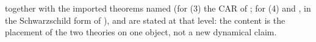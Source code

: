 together with the imported theorems named (for (3) the CAR of ; for (4)  and , in the Schwarzschild form of ), and are stated at that level: the content is the placement of the two theories on one object, not a new dynamical claim.
